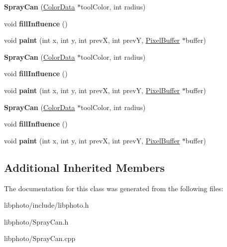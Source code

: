 \begin{DoxyCompactItemize}
\item 
\hypertarget{classSprayCan_a5491c5e7346fb7126b45405664b22f5d}{{\bfseries Spray\-Can} (\hyperlink{classColorData}{Color\-Data} $\ast$tool\-Color, int radius)}\label{classSprayCan_a5491c5e7346fb7126b45405664b22f5d}

\item 
\hypertarget{classSprayCan_a86321320d34fdc49c754ce6d1ff324fd}{void {\bfseries fill\-Influence} ()}\label{classSprayCan_a86321320d34fdc49c754ce6d1ff324fd}

\item 
\hypertarget{classSprayCan_ade6115cd8e7f277c74b0c6ade3547e2c}{void {\bfseries paint} (int x, int y, int prev\-X, int prev\-Y, \hyperlink{classPixelBuffer}{Pixel\-Buffer} $\ast$buffer)}\label{classSprayCan_ade6115cd8e7f277c74b0c6ade3547e2c}

\item 
\hypertarget{classSprayCan_a5491c5e7346fb7126b45405664b22f5d}{{\bfseries Spray\-Can} (\hyperlink{classColorData}{Color\-Data} $\ast$tool\-Color, int radius)}\label{classSprayCan_a5491c5e7346fb7126b45405664b22f5d}

\item 
\hypertarget{classSprayCan_a86321320d34fdc49c754ce6d1ff324fd}{void {\bfseries fill\-Influence} ()}\label{classSprayCan_a86321320d34fdc49c754ce6d1ff324fd}

\item 
\hypertarget{classSprayCan_ade6115cd8e7f277c74b0c6ade3547e2c}{void {\bfseries paint} (int x, int y, int prev\-X, int prev\-Y, \hyperlink{classPixelBuffer}{Pixel\-Buffer} $\ast$buffer)}\label{classSprayCan_ade6115cd8e7f277c74b0c6ade3547e2c}

\item 
\hypertarget{classSprayCan_a5491c5e7346fb7126b45405664b22f5d}{{\bfseries Spray\-Can} (\hyperlink{classColorData}{Color\-Data} $\ast$tool\-Color, int radius)}\label{classSprayCan_a5491c5e7346fb7126b45405664b22f5d}

\item 
\hypertarget{classSprayCan_a86321320d34fdc49c754ce6d1ff324fd}{void {\bfseries fill\-Influence} ()}\label{classSprayCan_a86321320d34fdc49c754ce6d1ff324fd}

\item 
\hypertarget{classSprayCan_ade6115cd8e7f277c74b0c6ade3547e2c}{void {\bfseries paint} (int x, int y, int prev\-X, int prev\-Y, \hyperlink{classPixelBuffer}{Pixel\-Buffer} $\ast$buffer)}\label{classSprayCan_ade6115cd8e7f277c74b0c6ade3547e2c}

\end{DoxyCompactItemize}
\subsection*{Additional Inherited Members}


The documentation for this class was generated from the following files\-:\begin{DoxyCompactItemize}
\item 
libphoto/include/libphoto.\-h\item 
libphoto/Spray\-Can.\-h\item 
libphoto/Spray\-Can.\-cpp\end{DoxyCompactItemize}
